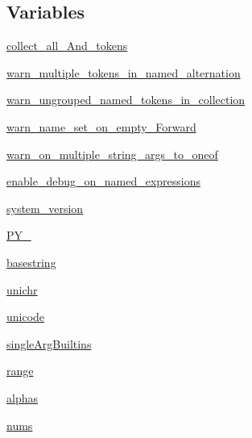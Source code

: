 \subsection*{Variables}
\begin{DoxyCompactItemize}
\item 
\hyperlink{namespacepip_1_1__vendor_1_1pyparsing_a4ff10957969f41b37ed31460821141b8}{collect\+\_\+all\+\_\+\+And\+\_\+tokens}
\item 
\hyperlink{namespacepip_1_1__vendor_1_1pyparsing_ab31ae153ce652f0f0800a5e305b61f79}{warn\+\_\+multiple\+\_\+tokens\+\_\+in\+\_\+named\+\_\+alternation}
\item 
\hyperlink{namespacepip_1_1__vendor_1_1pyparsing_a559999638c571a04617fd0c8f32acbaa}{warn\+\_\+ungrouped\+\_\+named\+\_\+tokens\+\_\+in\+\_\+collection}
\item 
\hyperlink{namespacepip_1_1__vendor_1_1pyparsing_a44be796a353f7fca052e4d391862b2f6}{warn\+\_\+name\+\_\+set\+\_\+on\+\_\+empty\+\_\+\+Forward}
\item 
\hyperlink{namespacepip_1_1__vendor_1_1pyparsing_a1b25489f2b82743d438df1b12ecdfdb6}{warn\+\_\+on\+\_\+multiple\+\_\+string\+\_\+args\+\_\+to\+\_\+oneof}
\item 
\hyperlink{namespacepip_1_1__vendor_1_1pyparsing_a800ca48d9c859ec29df5b55475689974}{enable\+\_\+debug\+\_\+on\+\_\+named\+\_\+expressions}
\item 
\hyperlink{namespacepip_1_1__vendor_1_1pyparsing_ad772a96e02713d36201a50d6f057fd55}{system\+\_\+version}
\item 
\hyperlink{namespacepip_1_1__vendor_1_1pyparsing_a146f29d3f66fb339f4f008f5eb4496ed}{P\+Y\+\_}
\item 
\hyperlink{namespacepip_1_1__vendor_1_1pyparsing_aae8e98a31b22deeaa0d92aab7842add3}{basestring}
\item 
\hyperlink{namespacepip_1_1__vendor_1_1pyparsing_a576874c064975cd4554179f201b09345}{unichr}
\item 
\hyperlink{namespacepip_1_1__vendor_1_1pyparsing_a933c522fca16f28860a70a2dfb3c7e6c}{unicode}
\item 
\hyperlink{namespacepip_1_1__vendor_1_1pyparsing_ad0c28be4a4f2420168f34173d46d32e7}{single\+Arg\+Builtins}
\item 
\hyperlink{namespacepip_1_1__vendor_1_1pyparsing_ac84229f28b3ef0c25c51348445c99607}{range}
\item 
\hyperlink{namespacepip_1_1__vendor_1_1pyparsing_a8f614fdc6550dd17c157b8ef85b3983d}{alphas}
\item 
\hyperlink{namespacepip_1_1__vendor_1_1pyparsing_a213b501d8e06fc1e075ee8f6824374f5}{nums}

\end{DoxyCompactItemize}
